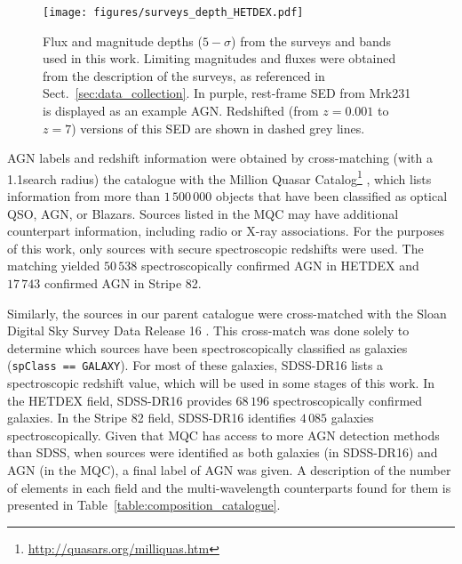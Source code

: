 \documentclass{aa}
\begin{document}
\begin{figure}
   \centering
   \texttt{[image: figures/surveys\_depth\_HETDEX.pdf]}
   \caption{Flux and magnitude depths ($5{-}\sigma$) from the surveys and bands used in this work. Limiting magnitudes and fluxes were obtained from the description of the surveys, as referenced in Sect.~\ref{sec:data_collection}. In purple, rest-frame SED from Mrk231 \citep[$z = 0.0422$,][]{2019MNRAS.489.3351B} is displayed as an example AGN. Redshifted (from $z {=} 0.001$ to $z {=} 7$) versions of this SED are shown in dashed grey lines.}
   \label{fig:surveys_depth_HETDEX}
\end{figure}

AGN labels and redshift information were obtained by cross-matching (with a 1.1\arcsec search radius) the catalogue with the Million Quasar Catalog\footnote{\url{http://quasars.org/milliquas.htm}} \citep[MQC, v7.4d;][]{2021arXiv210512985F}, which lists information from more than $1\,500\,000$ objects that have been classified as optical QSO, AGN, or Blazars. Sources listed in the MQC may have additional counterpart information, including radio or X-ray associations. For the purposes of this work, only sources with secure spectroscopic redshifts were used. The matching yielded $50\,538$ spectroscopically confirmed AGN in HETDEX and $17\,743$ confirmed AGN in Stripe 82.

Similarly, the sources in our parent catalogue were cross-matched with the Sloan Digital Sky Survey Data Release 16 \citep[SDSS-DR16;][]{2020ApJS..249....3A}. This cross-match was done solely to determine which sources have been spectroscopically classified as galaxies (\verb|spClass == GALAXY|). 
For most of these galaxies, SDSS-DR16 lists a spectroscopic redshift value, which will be used in some stages of this work. In the HETDEX field, SDSS-DR16 provides $68\,196$ spectroscopically confirmed galaxies. In the Stripe 82 field, SDSS-DR16 identifies $4\,085$ galaxies spectroscopically. Given that MQC has access to more AGN detection methods than SDSS, when sources were identified as both galaxies (in SDSS-DR16) and AGN (in the MQC), a final label of AGN was given. 
A description of the number of elements in each field and the multi-wavelength counterparts found for them is presented in Table~\ref{table:composition_catalogue}.
\end{document}
